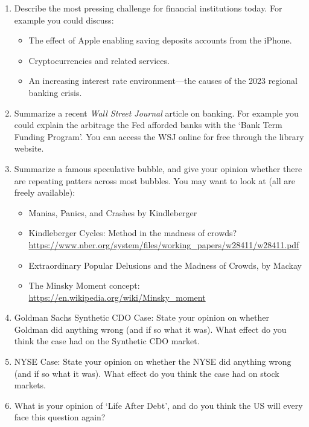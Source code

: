 \documentclass{article}
\begin{document}
\begin{enumerate}
\item Describe the most pressing challenge for financial institutions today.  For example you could discuss:
\begin{itemize}
\item The effect of Apple enabling saving deposits accounts from the iPhone.
\item Cryptocurrencies and related services.
\item An increasing interest rate environment---the causes of the 2023 regional banking crisis.
\end{itemize}

\item Summarize a recent {\it Wall Street Journal} article on banking.  For example you could explain the arbitrage the Fed afforded banks with the `Bank Term Funding Program'.  You can access the WSJ online for free through the library website.

\item Summarize a famous speculative bubble, and give your opinion whether there are repeating patters across most bubbles.  You may want to look at (all are freely available):
  \begin{itemize}
  \item Manias, Panics, and Crashes by Kindleberger
  \item Kindleberger Cycles: Method in the madness of crowds? \url{https://www.nber.org/system/files/working_papers/w28411/w28411.pdf}
  \item Extraordinary Popular Delusions and the Madness of Crowds, by Mackay
  \item The Minsky Moment  concept: \url{https://en.wikipedia.org/wiki/Minsky_moment}
  \end{itemize}

\item Goldman Sachs Synthetic CDO Case:  State your opinion on whether Goldman did anything wrong (and if so what it was).  What effect do you think the case had on the Synthetic CDO market.  
\item NYSE Case: State your opinion on whether the NYSE did anything wrong (and if so what it was).  What effect do you think the case had on stock markets.
\item What is your opinion of `Life After Debt', and do you think the US will every face this question again?
\end{enumerate}
\end{document}
